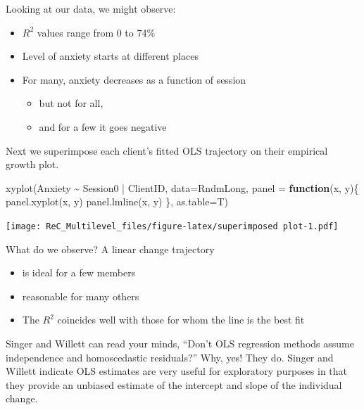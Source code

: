 \documentclass[
  english,
]{book}
\newenvironment{Shaded}{\begin{snugshade}}{\end{snugshade}}
\newcommand{\AttributeTok}[1]{\textcolor[rgb]{0.77,0.63,0.00}{#1}}
\newcommand{\ControlFlowTok}[1]{\textcolor[rgb]{0.13,0.29,0.53}{\textbf{#1}}}
\newcommand{\FunctionTok}[1]{\textcolor[rgb]{0.00,0.00,0.00}{#1}}
\newcommand{\NormalTok}[1]{#1}
\newcommand{\SpecialCharTok}[1]{\textcolor[rgb]{0.00,0.00,0.00}{#1}}
\providecommand{\tightlist}{%
  \setlength{\itemsep}{0pt}\setlength{\parskip}{0pt}}
\begin{document}
Looking at our data, we might observe:

\begin{itemize}
\tightlist
\item
  \(R^2\) values range from 0 to 74\%
\item
  Level of anxiety starts at different places
\item
  For many, anxiety decreases as a function of session

  \begin{itemize}
  \tightlist
  \item
    but not for all,
  \item
    and for a few it goes negative
  \end{itemize}
\end{itemize}

Next we superimpose each client's fitted OLS trajectory on their empirical growth plot.

\begin{Shaded}
\begin{Highlighting}[]
\FunctionTok{xyplot}\NormalTok{(Anxiety }\SpecialCharTok{\textasciitilde{}}\NormalTok{ Session0 }\SpecialCharTok{|}\NormalTok{ ClientID, }\AttributeTok{data=}\NormalTok{RndmLong,}
  \AttributeTok{panel =} \ControlFlowTok{function}\NormalTok{(x, y)\{}
    \FunctionTok{panel.xyplot}\NormalTok{(x, y)}
    \FunctionTok{panel.lmline}\NormalTok{(x, y)}
\NormalTok{  \},  }\AttributeTok{as.table=}\NormalTok{T)}
\end{Highlighting}
\end{Shaded}

\texttt{[image: ReC\_Multilevel\_files/figure-latex/superimposed plot-1.pdf]}

What do we observe? A linear change trajectory

\begin{itemize}
\tightlist
\item
  is ideal for a few members
\item
  reasonable for many others
\item
  The \(R^2\) coincides well with those for whom the line is the best fit
\end{itemize}

Singer and Willett \citeyearpar{singer_applied_2003} can read your minds, ``Don't OLS regression methods assume independence and homoscedastic residuals?'' Why, yes! They do. Singer and Willett indicate OLS estimates are very useful for exploratory purposes in that they provide an unbiased estimate of the intercept and slope of the individual change.
\end{document}
